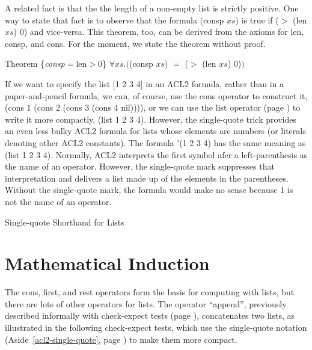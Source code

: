 A related fact is that the the length of a non-empty list is strictly positive.
One way to state that fact is to observe that the formula (consp $xs$) is true
if ($>$ (len $xs$) 0) and vice-versa. %
This theorem, too, can be derived from the axioms for
len, consp, and cons. For the moment,
we state the theorem without proof.
\begin{samepage}
\label{consp-len-thm}
\begin{center}
Theorem \{\emph{consp}$=$len$>$0\} $\forall xs.($(consp $xs$) $=$ ($>$ (len $xs$) 0)$)$
\end{center}
\end{samepage}

\begin{aside}
If we want to specify the list [1 2 3 4] in an ACL2 formula,
rather than in a paper-and-pencil formula,
we can, of course, use the cons operator to construct it,
(cons 1 (cons 2 (cons 3 (cons 4 nil)))),
or we can use the list operator (page \pageref{list-op-informal}) to write it more compactly,
(list 1 2 3 4).
However, the single-quote trick provides an even less bulky ACL2 formula for lists
whose elements are numbers (or literals denoting other ACL2 constants).
The formula
'(1 2 3 4) has the same meaning as (list 1 2 3 4).
Normally, ACL2 interprets the first symbol afer a left-parenthesis
as the name of an operator.
However, the single-quote mark suppresses that interpretation and
delivers a list made up of the elements in the parentheses.
Without the single-quote mark,
the formula would make no sense because 1 is not the name of an operator.
\caption{Single-quote Shorthand for Lists}
\label{acl2-single-quote}
\end{aside}

\section{Mathematical Induction}
\label{sec:induction}
The cons, first, and rest operators form the basis for computing with lists,
but there are lots of other operators for lists.
The operator ``append'', previously described informally with check-expect tests
(page \pageref{append-op-informal}), concatenates two lists, as illustrated
in the following check-expect tests,
which use the single-quote notation (Aside~\ref{acl2-single-quote}, page \pageref{acl2-single-quote})
to make them more compact.

